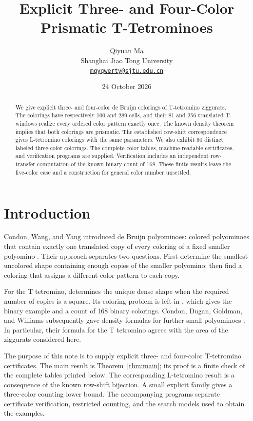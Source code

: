 \documentclass[11pt]{article}
\title{Explicit Three- and Four-Color Prismatic T-Tetrominoes}
\author{Qiyuan Ma\\
Shanghai Jiao Tong University\\
\href{mailto:mqyqwerty@sjtu.edu.cn}{\texttt{mqyqwerty@sjtu.edu.cn}}}
\date{24 October 2026}
\begin{document}
\maketitle

\begin{abstract}
We give explicit three- and four-color de Bruijn colorings of T-tetromino
ziggurats. The colorings have respectively 100 and 289 cells, and their 81
and 256 translated T-windows realize every ordered color pattern exactly
once. The known density theorem implies that both colorings are prismatic.
The established row-shift correspondence gives L-tetromino colorings with
the same parameters. We also exhibit 60 distinct labeled three-color
colorings. The complete color tables, machine-readable certificates, and
verification programs are supplied. Verification includes an independent
row-transfer computation of the known binary count of 168. These finite
results leave the five-color case and a construction for general color
number unsettled.
\end{abstract}

\section{Introduction}
Condon, Wang, and Yang introduced de Bruijn polyominoes: colored
polyominoes that contain exactly one translated copy of every coloring
of a fixed smaller polyomino \cite{CWY}. Their approach separates two
questions. First determine the smallest uncolored shape containing
enough copies of the smaller polyomino; then find a coloring that assigns
a different color pattern to each copy.

For the T tetromino, \cite[v2, Theorem 5.1]{CWY} determines the unique
dense shape when the required number of copies is a square. Its coloring
problem is left in \cite[v2, Remark 5.4]{CWY}, which gives the binary
example and a count of 168 binary colorings. Condon, Dugan, Goldman,
and Williams subsequently gave density formulas for further small
polyominoes \cite[Table 1]{CDGW}. In particular, their formula for the
T tetromino agrees with the area of the ziggurats considered here.

The purpose of this note is to supply explicit three- and four-color
T-tetromino certificates. The main result is Theorem~\ref{thm:main}; its
proof is a finite check of the complete tables printed below. The
corresponding L-tetromino result is a consequence of the known row-shift
bijection. A small explicit family gives a three-color counting lower
bound. The accompanying programs separate certificate verification,
restricted counting, and the search models used to obtain the examples.
\end{document}
